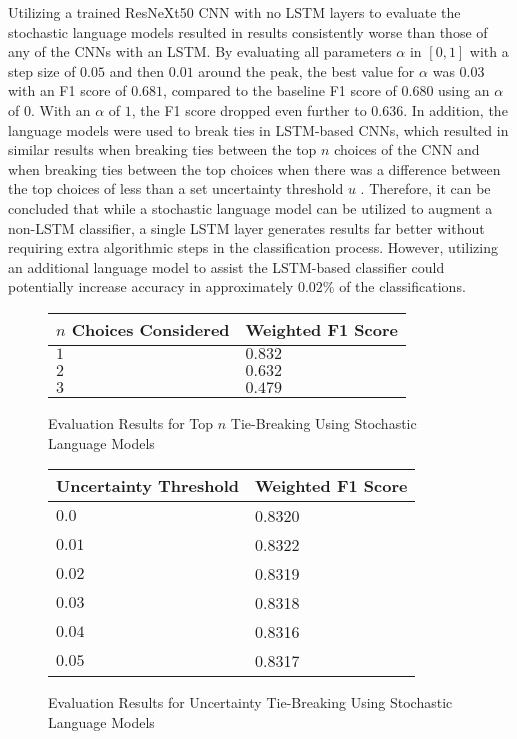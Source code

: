 Utilizing a trained ResNeXt50 CNN with no LSTM layers to evaluate the stochastic language models resulted in results consistently worse than those of any of the CNNs with an LSTM. By evaluating all parameters $\alpha$ in $[0,1]$ with a step size of $0.05$ and then $0.01$ around the peak, the best value for $\alpha$ was $0.03$ with an F1 score of $0.681$, compared to the baseline F1 score of $0.680$ using an $\alpha$ of $0$. With an $\alpha$ of $1$, the F1 score dropped even further to $0.636$. In addition, the language models were used to break ties in LSTM-based CNNs, which resulted in similar results when breaking ties between the top $n$ choices of the CNN  and when breaking ties between the top choices when there was a difference between the top choices of less than a set uncertainty threshold $u$ . Therefore, it can be concluded that while a stochastic language model can be utilized to augment a non-LSTM classifier, a single LSTM layer generates results far better without requiring extra algorithmic steps in the classification process. However, utilizing an additional language model to assist the LSTM-based classifier could potentially increase accuracy in approximately $0.02\%$ of the classifications.

\begin{figure}[H]
    \caption{Evaluation Results for Top $n$ Tie-Breaking Using Stochastic Language Models}
    \label{fig:classificationMarkovTopN}
    \centering
    \begin{tabular}{ | l | l | }
        \hline
        $n$ Choices Considered & Weighted F1 Score \\
        \hline
        $1$ & $0.832$ \\
        $2$ & $0.632$ \\
        $3$ & $0.479$ \\
        \hline
    \end{tabular}
\end{figure}

\begin{figure}[H]
    \caption{Evaluation Results for Uncertainty Tie-Breaking Using Stochastic Language Models}
    \label{fig:classificationMarkovUncertainty}
    \centering
    \begin{tabular}{ | l | l | }
        \hline
        Uncertainty Threshold & Weighted F1 Score \\
        \hline
        $0.0$ & 0.8320 \\
        $0.01$ & 0.8322 \\
        $0.02$ & 0.8319 \\
        $0.03$ & 0.8318 \\
        $0.04$ & 0.8316 \\
        $0.05$ & 0.8317 \\
        \hline
    \end{tabular}
\end{figure}

